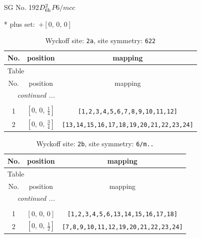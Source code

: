\documentclass[fleqn,8pt]{jsarticle}
\begin{document}
\setcounter{MaxMatrixCols}{32}

\renewcommand{\tablename}{Table~}
\renewcommand{\figurename}{Figure~}
\begin{center}
\LARGE
SG No. 192\quad$D_{\rm 6h}^{2}$\quad$P6/mcc$\quad[ hexagonal ]
\end{center}
* plus set:\,\,\,$+\left[ 0,\, 0,\, 0 \right]$
\renewcommand{\arraystretch}{1.2}
\begin{longtable}{ccc}
\caption{Wyckoff site: {\tt 2a}, site symmetry: {\tt 622}}
 \\
 \hline \hline
No. & position & mapping \\ \hline \endfirsthead

\multicolumn{2}{l}{\tablename\ \thetable{}} \\
 \hline \hline
No. & position & mapping \\ \hline \endhead

 \hline \hline
\multicolumn{2}{r}{\footnotesize\it continued ...} \\ \endfoot

 \hline \hline
\multicolumn{2}{r}{} \\ \endlastfoot

1 & $\left[ 0,\, 0,\, \frac{1}{4} \right]$ & {\tt [1,2,3,4,5,6,7,8,9,10,11,12]} \\ \hline
2 & $\left[ 0,\, 0,\, \frac{3}{4} \right]$ & {\tt [13,14,15,16,17,18,19,20,21,22,23,24]} \\
\end{longtable}
\renewcommand{\arraystretch}{1.2}
\begin{longtable}{ccc}
\caption{Wyckoff site: {\tt 2b}, site symmetry: {\tt 6/m..}}
 \\
 \hline \hline
No. & position & mapping \\ \hline \endfirsthead

\multicolumn{2}{l}{\tablename\ \thetable{}} \\
 \hline \hline
No. & position & mapping \\ \hline \endhead

 \hline \hline
\multicolumn{2}{r}{\footnotesize\it continued ...} \\ \endfoot

 \hline \hline
\multicolumn{2}{r}{} \\ \endlastfoot

1 & $\left[ 0,\, 0,\, 0 \right]$ & {\tt [1,2,3,4,5,6,13,14,15,16,17,18]} \\ \hline
2 & $\left[ 0,\, 0,\, \frac{1}{2} \right]$ & {\tt [7,8,9,10,11,12,19,20,21,22,23,24]} \\
\end{longtable}
\end{document}
